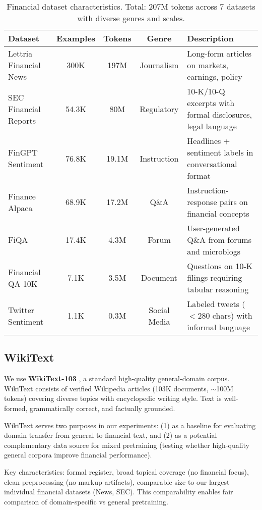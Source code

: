 \begin{table}[h]
\centering
\caption[Financial Dataset Characteristics]{Financial dataset characteristics. Total: 207M tokens across 7 datasets with diverse genres and scales.}
\label{tab:financial_datasets}
\small
\begin{tabular}{p{3cm}cccp{5.5cm}}
\toprule
\textbf{Dataset} & \textbf{Examples} & \textbf{Tokens} & \textbf{Genre} & \textbf{Description} \\
\midrule
Lettria Financial News & 300K & 197M & Journalism & Long-form articles on markets, earnings, policy \\
\midrule
SEC Financial Reports & 54.3K & 80M & Regulatory & 10-K/10-Q excerpts with formal disclosures, legal language \\
\midrule
FinGPT Sentiment & 76.8K & 19.1M & Instruction & Headlines + sentiment labels in conversational format \\
\midrule
Finance Alpaca & 68.9K & 17.2M & Q\&A & Instruction-response pairs on financial concepts \\
\midrule
FiQA & 17.4K & 4.3M & Forum & User-generated Q\&A from forums and microblogs \\
\midrule
Financial QA 10K & 7.1K & 3.5M & Document & Questions on 10-K filings requiring tabular reasoning \\
\midrule
Twitter Sentiment & 1.1K & 0.3M & Social Media & Labeled tweets ($<$280 chars) with informal language \\
\bottomrule
\end{tabular}
\end{table}

\subsection{WikiText}

We use \textbf{WikiText-103} \parencite{merity2016pointer}, a standard high-quality general-domain corpus. WikiText consists of verified Wikipedia articles (103K documents, $\sim$100M tokens) covering diverse topics with encyclopedic writing style. Text is well-formed, grammatically correct, and factually grounded.

WikiText serves two purposes in our experiments: (1) as a baseline for evaluating domain transfer from general to financial text, and (2) as a potential complementary data source for mixed pretraining (testing whether high-quality general corpora improve financial performance).

Key characteristics: formal register, broad topical coverage (no financial focus), clean preprocessing (no markup artifacts), comparable size to our largest individual financial datasets (News, SEC). This comparability enables fair comparison of domain-specific vs general pretraining.

